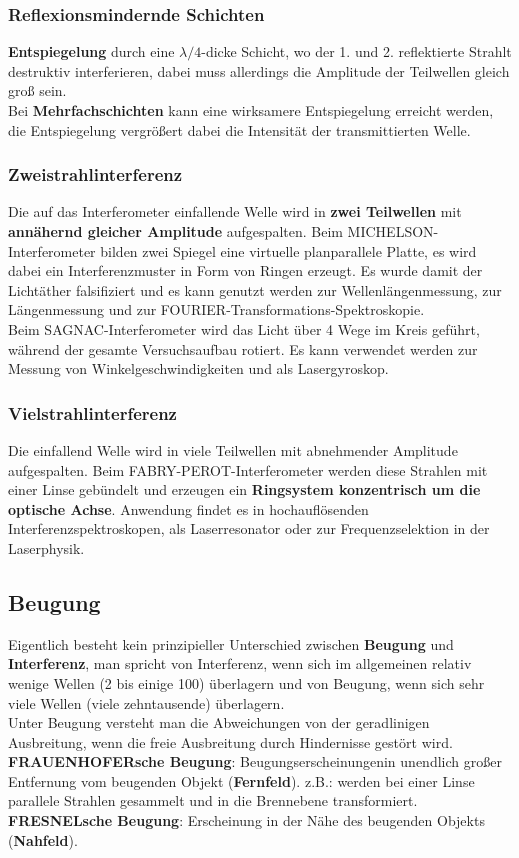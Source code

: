 \documentclass[12pt,a4paper,ngerman]{article}
\begin{document}
\subsubsection*{Reflexionsmindernde Schichten}
\textbf{Entspiegelung} durch eine $\lambda/4$-dicke Schicht, wo der 1. und 2. reflektierte Strahlt destruktiv interferieren, dabei muss allerdings die Amplitude der Teilwellen gleich groß sein. \\
Bei \textbf{Mehrfachschichten} kann eine wirksamere Entspiegelung erreicht werden, die Entspiegelung vergrößert dabei die Intensität der transmittierten Welle.

\subsubsection*{Zweistrahlinterferenz}
Die auf das Interferometer einfallende Welle wird in \textbf{zwei Teilwellen} mit \textbf{annähernd gleicher Amplitude} aufgespalten. Beim MICHELSON-Interferometer bilden zwei Spiegel eine virtuelle planparallele Platte, es wird dabei ein Interferenzmuster in Form von Ringen erzeugt. Es wurde damit der Lichtäther falsifiziert und es kann genutzt werden zur Wellenlängenmessung, zur Längenmessung und zur FOURIER-Transformations-Spektroskopie.  \\
Beim SAGNAC-Interferometer wird das Licht über 4 Wege im Kreis geführt, während der gesamte Versuchsaufbau rotiert. Es kann verwendet werden zur Messung von Winkelgeschwindigkeiten und als Lasergyroskop. 

\subsubsection*{Vielstrahlinterferenz}
Die einfallend Welle wird in viele Teilwellen mit abnehmender Amplitude aufgespalten. Beim FABRY-PEROT-Interferometer werden diese Strahlen mit einer Linse gebündelt und erzeugen ein \textbf{Ringsystem konzentrisch um die optische Achse}. Anwendung findet es in hochauflösenden Interferenzspektroskopen, als Laserresonator oder zur Frequenzselektion in der Laserphysik. 


\subsection{Beugung}

Eigentlich besteht kein prinzipieller Unterschied zwischen \textbf{Beugung} und \textbf{Interferenz}, man spricht von Interferenz, wenn sich im allgemeinen relativ wenige Wellen (2 bis einige 100) überlagern und von Beugung, wenn sich sehr viele Wellen (viele zehntausende) überlagern. \\
Unter Beugung versteht man die Abweichungen von der geradlinigen Ausbreitung, wenn die freie Ausbreitung durch Hindernisse gestört wird. \\
\textbf{FRAUENHOFERsche Beugung}: Beugungserscheinungenin unendlich großer Entfernung vom beugenden Objekt (\textbf{Fernfeld}). z.B.: werden bei einer Linse parallele Strahlen gesammelt und in die Brennebene transformiert. \\
\textbf{FRESNELsche Beugung}: Erscheinung in der Nähe des beugenden Objekts (\textbf{Nahfeld}).
\end{document}
